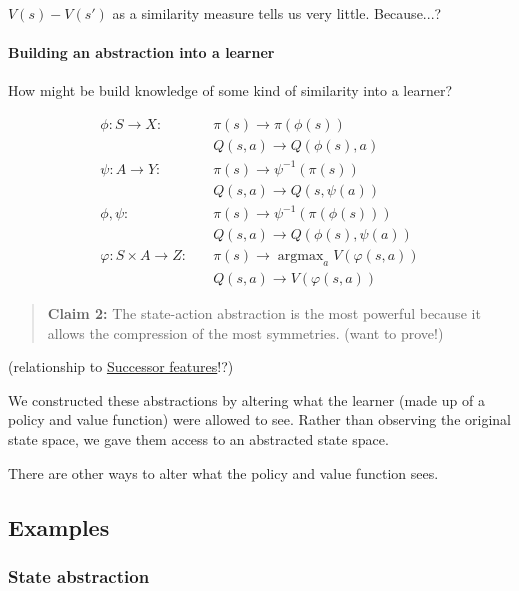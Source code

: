 $V(s) - V(s')$ as a similarity measure tells us very little. Because...?

\paragraph{Building an abstraction into a learner}

How might be build knowledge of some kind of similarity into a learner?

\begin{align*}
\phi: S \to X: \quad &\pi(s) \to \pi(\phi(s)) \\
&Q(s, a) \to Q(\phi(s), a) \tag{State abstraction} \\
\psi: A\to Y: \quad &\pi(s) \to \psi^{-1}(\pi(s)) \\
&Q(s, a) \to Q(s, \psi(a)) \tag{Action abstraction} \\
\phi, \psi: \quad &\pi(s) \to \psi^{-1}(\pi(\phi(s))) \\
&Q(s, a) \to Q(\phi(s), \psi(a)) \tag{State and action abstraction} \\
\varphi: S \times A \to Z: \quad &\pi(s)\to \mathop{\text{argmax}}_a V(\varphi(s, a)) \\
&Q(s, a) \to V(\varphi(s, a)) \tag{State-action abstraction}
\end{align*}

\begin{quote}
\textbf{Claim 2:} The state-action abstraction is the most powerful
because it allows the compression of the most symmetries. (want to
prove!)
\end{quote}

(relationship to
\href{http://www.gatsby.ucl.ac.uk/~dayan/papers/d93b.pdf}{Successor
features}!?)

We constructed these abstractions by altering what the learner (made up of a policy and
value function) were allowed to see. Rather than observing the original
state space, we gave them access to an abstracted state space.

There are other ways to alter what the policy and value function sees.

\subsection{Examples}

\subsubsection{State abstraction}

